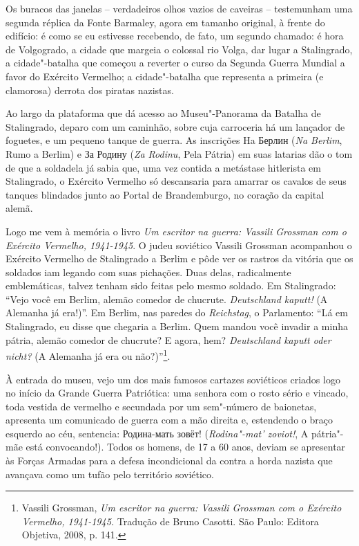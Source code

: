 Os buracos das janelas -- verdadeiros olhos vazios de caveiras --
testemunham uma segunda réplica da Fonte Barmaley, agora em tamanho
original, à frente do edifício: é como se eu estivesse recebendo, de
fato, um segundo chamado: é hora de Volgogrado, a cidade que margeia o
colossal rio Volga, dar lugar a Stalingrado, a cidade"-batalha que
começou a reverter o curso da Segunda Guerra Mundial a favor do Exército
Vermelho; a cidade"-batalha que representa a primeira (e clamorosa)
derrota dos piratas nazistas.

Ao largo da plataforma que dá acesso ao Museu"-Panorama da Batalha de
Stalingrado, deparo com um caminhão, sobre cuja carroceria há um
lançador de foguetes, e um pequeno tanque de guerra. As inscrições Ha
Берлин (\emph{Na Berlim}, Rumo a Berlim) e За Родину (\emph{Za Rodinu},
Pela Pátria) em suas latarias dão o tom de que a soldadela já sabia que,
uma vez contida a metástase hitlerista em Stalingrado, o Exército
Vermelho só descansaria para amarrar os cavalos de seus tanques
blindados junto ao Portal de Brandemburgo, no coração da capital alemã.

Logo me vem à memória o livro \emph{Um escritor na guerra: Vassili
Grossman com o Exército Vermelho, 1941-1945}. O judeu soviético Vassili
Grossman acompanhou o Exército Vermelho de Stalingrado a Berlim e pôde
ver os rastros da vitória que os soldados iam legando com suas
pichações. Duas delas, radicalmente emblemáticas, talvez tenham sido
feitas pelo mesmo soldado. Em Stalingrado: ``Vejo você em Berlim, alemão
comedor de chucrute. \emph{Deutschland kaputt!} (A Alemanha já era!)''.
Em Berlim, nas paredes do \emph{Reichstag}, o Parlamento: ``Lá em
Stalingrado, eu disse que chegaria a Berlim. Quem mandou você invadir a
minha pátria, alemão comedor de chucrute? E agora, hem?
\emph{Deutschland kaputt oder nicht?} (A Alemanha já era ou
não?)''\footnote{Vassili Grossman, \emph{Um escritor na guerra: Vassili
  Grossman com o Exército Vermelho, 1941-1945.} Tradução de Bruno
  Casotti. São Paulo: Editora Objetiva, 2008, p. 141.}.

À entrada do museu, vejo um dos mais famosos cartazes soviéticos criados
logo no início da Grande Guerra Patriótica: uma senhora com o rosto
sério e vincado, toda vestida de vermelho e secundada por um sem"-número
de baionetas, apresenta um comunicado de guerra com a mão direita e,
estendendo o braço esquerdo ao céu, sentencia: Родина-мать зовёт!
(\emph{Rodina"-mat' zoviot!}, A pátria"-mãe está convocando!). Todos os
homens, de 17 a 60 anos, deviam se apresentar às Forças Armadas para a
defesa incondicional da  contra a horda nazista que avançava como um
tufão pelo território soviético.

